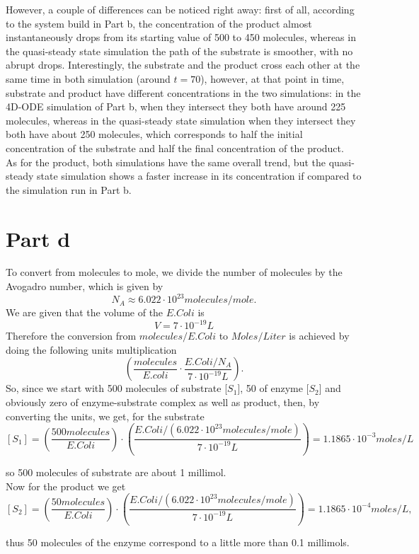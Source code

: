 However, a couple of differences can be noticed right away: first of all, according to the system build in Part b, the concentration of the product almost instantaneously drops from its starting value of 500 to 450 molecules, whereas in the quasi-steady state simulation the path of the substrate is smoother, with no abrupt drops. Interestingly, the substrate and the product cross each other at the same time in both simulation (around $t=70$), however, at that point in time, substrate and product have different concentrations in the two simulations: in the 4D-ODE simulation of Part b, when they intersect they both have around 225 molecules, whereas in the quasi-steady state simulation when they intersect they both have about 250 molecules, which corresponds to half the initial concentration of the substrate and half the final concentration of the product.\\
As for the product, both simulations have the same overall trend, but the quasi-steady state simulation shows a faster increase in its concentration if compared to the simulation run in Part b.

\section{Part d}
To convert from molecules to mole, we divide the number of molecules by the Avogadro number, which is given by
$$
N_{A} \approx 6.022 \cdot 10^{23} molecules/mole.
$$
We are given that the volume of the $\textit{E.Coli}$ is
$$
V = 7 \cdot 10^{-19}L
$$
Therefore the conversion from $\textit{molecules/E.Coli}$ to $\textit{Moles/Liter}$ is achieved by doing the following units multiplication
$$
\left(\frac{molecules}{E.coli} \cdot \frac{E.Coli/N_{A}}{7 \cdot 10^{-19}L}\right).
$$
So, since we start with 500 molecules of substrate [$S_{1}$], 50 of enzyme [$S_{2}$] and obviously zero of enzyme-substrate complex as well as product, then, by converting the units, we get, for the substrate
$$
[S_{1}] = \left(\frac{500 molecules}{E.Coli}\right) \cdot \left(\frac{E.Coli/(6.022\cdot 10^{23} molecules/mole)}{7 \cdot 10^{-19}L}\right) = 1.1865 \cdot 10^{-3} moles/L
$$

so 500 molecules of substrate are about 1 millimol.\\
Now for the product we get
$$
[S_{2}] = \left(\frac{50 molecules}{E.Coli}\right) \cdot \left(\frac{E.Coli/(6.022\cdot 10^{23} molecules/mole)}{7 \cdot 10^{-19}L}\right) = 1.1865 \cdot 10^{-4} moles/L,
$$

thus 50 molecules of the enzyme correspond to a little more than 0.1 millimols.\\

